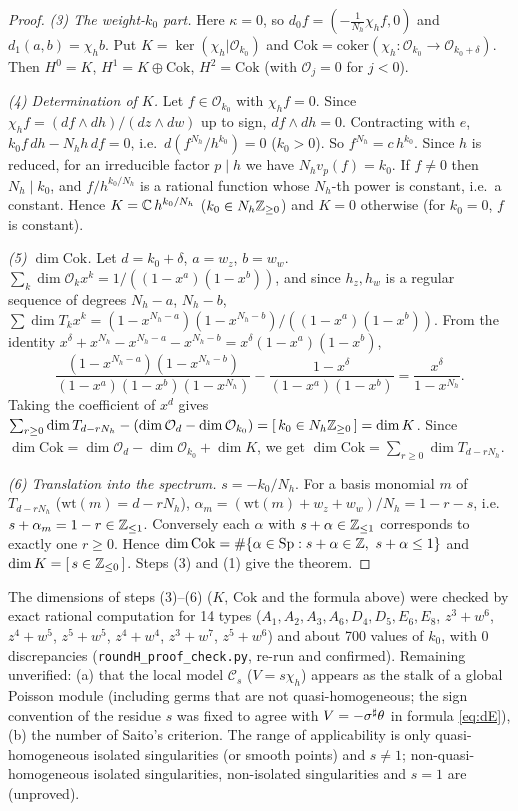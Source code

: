 \begin{proof}
\emph{(3) The weight-$k_0$ part.} Here $\kappa=0$, so $d_0f=(-\tfrac1{N_h}\chi_hf,0)$ and $d_1(a,b)=\chi_hb$. Put $K=\ker(\chi_h|\mathcal O_{k_0})$ and $\mathrm{Cok}=\mathrm{coker}(\chi_h:\mathcal O_{k_0}\to\mathcal O_{k_0+\delta})$. Then $H^0=K$, $H^1=K\oplus\mathrm{Cok}$, $H^2=\mathrm{Cok}$ (with $\mathcal O_j=0$ for $j<0$).

\emph{(4) Determination of $K$.} Let $f\in\mathcal O_{k_0}$ with $\chi_hf=0$. Since $\chi_hf=(df\wedge dh)/(dz\wedge dw)$ up to sign, $df\wedge dh=0$. Contracting with $e$, $k_0f\,dh-N_hh\,df=0$, i.e.\ $d(f^{N_h}/h^{k_0})=0$ ($k_0>0$). So $f^{N_h}=c\,h^{k_0}$. Since $h$ is reduced, for an irreducible factor $p\mid h$ we have $N_hv_p(f)=k_0$. If $f\ne0$ then $N_h\mid k_0$, and $f/h^{k_0/N_h}$ is a rational function whose $N_h$-th power is constant, i.e.\ a constant. Hence $K=\mathbb C\,h^{k_0/N_h}$ ($k_0\in N_h\mathbb Z_{\ge0}$) and $K=0$ otherwise (for $k_0=0$, $f$ is constant).

\emph{(5) $\dim\mathrm{Cok}$.} Let $d=k_0+\delta$, $a=w_z$, $b=w_w$. $\sum_k\dim\mathcal O_kx^k=1/((1-x^a)(1-x^b))$, and since $h_z,h_w$ is a regular sequence of degrees $N_h-a$, $N_h-b$, $\sum\dim T_kx^k=(1-x^{N_h-a})(1-x^{N_h-b})/((1-x^a)(1-x^b))$. From the identity $x^\delta+x^{N_h}-x^{N_h-a}-x^{N_h-b}=x^\delta(1-x^a)(1-x^b)$,
\[\frac{(1-x^{N_h-a})(1-x^{N_h-b})}{(1-x^a)(1-x^b)(1-x^{N_h})}-\frac{1-x^\delta}{(1-x^a)(1-x^b)}=\frac{x^\delta}{1-x^{N_h}}.\]
Taking the coefficient of $x^d$ gives $\sum_{r\ge0}\dim T_{d-rN_h}-(\dim\mathcal O_d-\dim\mathcal O_{k_0})=[\,k_0\in N_h\mathbb Z_{\ge0}\,]=\dim K$. Since $\dim\mathrm{Cok}=\dim\mathcal O_d-\dim\mathcal O_{k_0}+\dim K$, we get $\dim\mathrm{Cok}=\sum_{r\ge0}\dim T_{d-rN_h}$.

\emph{(6) Translation into the spectrum.} $s=-k_0/N_h$. For a basis monomial $m$ of $T_{d-rN_h}$ ($\mathrm{wt}(m)=d-rN_h$), $\alpha_m=(\mathrm{wt}(m)+w_z+w_w)/N_h=1-r-s$, i.e.\ $s+\alpha_m=1-r\in\mathbb Z_{\le1}$. Conversely each $\alpha$ with $s+\alpha\in\mathbb Z_{\le1}$ corresponds to exactly one $r\ge0$. Hence $\dim\mathrm{Cok}=\#\{\alpha\in\mathrm{Sp}:s+\alpha\in\Z,\ s+\alpha\le1\}$ and $\dim K=[\,s\in\mathbb Z_{\le0}\,]$. Steps (3) and (1) give the theorem. \qedhere
\end{proof}
\begin{rem}
\tV The dimensions of steps (3)--(6) ($K$, $\mathrm{Cok}$ and the formula above) were checked by exact rational computation for 14 types ($A_1,A_2,A_3,A_6,D_4,D_5,E_6,E_8$, $z^3+w^6$, $z^4+w^5$, $z^5+w^5$, $z^4+w^4$, $z^3+w^7$, $z^5+w^6$) and about 700 values of $k_0$, with 0 discrepancies (\texttt{roundH\_proof\_check.py}, re-run and confirmed). \tQ Remaining unverified: (a) that the local model $\mathcal C_s$ ($V=s\chi_h$) appears as the stalk of a global Poisson module (including germs that are not quasi-homogeneous; the sign convention of the residue $s$ was fixed to agree with $V=-\sigma^\sharp\theta$ in formula \eqref{eq:dE}), (b) the number of Saito's criterion. The range of applicability is only quasi-homogeneous isolated singularities (or smooth points) and $s\ne1$; non-quasi-homogeneous isolated singularities, non-isolated singularities and $s=1$ are \tK (unproved).
\end{rem}
